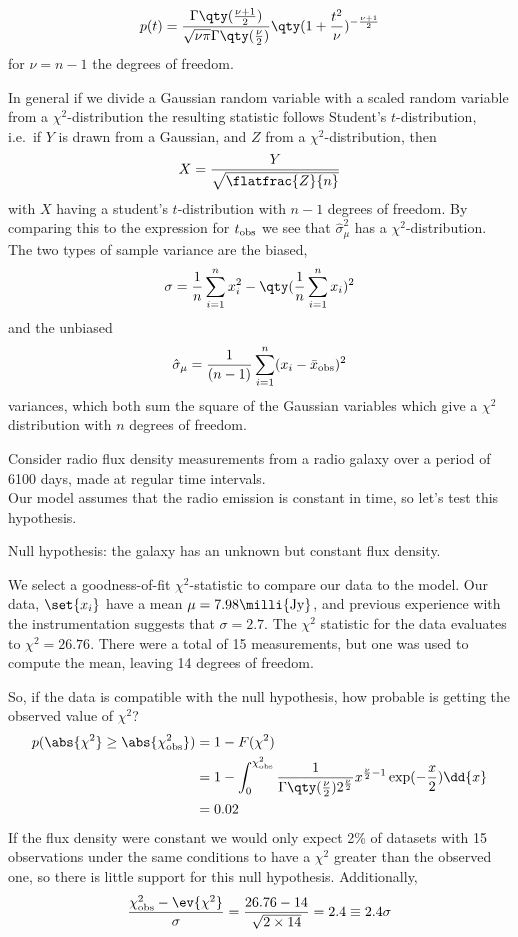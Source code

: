 \documentclass{dwnotes}         		        %
\begin{document}
\begin{definition}
  \begin{equation} p(t) = \frac{\Gamma \qty( \frac{\nu+1}{2} )}{\sqrt{\nu \pi}
    \Gamma \qty( \frac{\nu}{2} ) } \qty( 1 + \frac{t^2}{\nu} )^{-
    \frac{\nu+1}{2}}
\end{equation}
for $\nu = n-1$ the degrees of freedom.
\end{definition}

In general if we divide a Gaussian random variable with a scaled
random variable from a $\chi^2$-distribution the resulting statistic
follows Student's $t$-distribution, i.e.\ if $Y$ is drawn from a
Gaussian, and $Z$ from a $\chi^2$-distribution, then
\[ X = \frac{Y}{\sqrt{\flatfrac{Z}{n}}} \] with $X$ having a student's
$t$-distribution with $n-1$ degrees of freedom.  By comparing this to
the expression for $t_{\rm obs}$ we see that $\hat{\sigma}_{\mu}^2$
has a $\chi^2$-distribution.
The two types of sample variance are the biased,
\[ \sigma = \frac{1}{n} \sum_{i=1}^n x_i^2 - \qty( \frac{1}{n}
\sum_{i=1}^n x_i )^2 \]
and the unbiased
\[ \hat{\sigma}_{\mu} = \frac{1}{(n-1)} \sum_{i=1}^n (x_i -
\bar{x}_{\rm obs})^2 \] variances, which both sum the square of the
Gaussian variables which give a $\chi^2$ distribution with $n$ degrees
of freedom.

\begin{example}
  Consider radio flux density measurements from a radio galaxy over a
  period of 6100 days, made at regular time intervals.\\
  Our model assumes that the radio emission is constant in time, so
  let's test this hypothesis.

  Null hypothesis: the galaxy has an unknown but constant flux density.

  We select a goodness-of-fit $\chi^2$-statistic to compare our data
  to the model. Our data, $\set{x_i}$ have a mean $\mu = 7.98
  \milli{\rm Jy}$, and previous experience with the instrumentation
  suggests that $\sigma = 2.7$. The $\chi^2$ statistic for the data
  evaluates to $\chi^2 = 26.76$. There were a total of 15
  measurements, but one was used to compute the mean, leaving 14
  degrees of freedom.

  So, if the data is compatible with the null hypothesis, how probable
  is getting the observed value of $\chi^2$?
  \begin{align*}
    p(\abs{\chi^2} \ge \abs{\chi^2_{\rm obs}} ) &= 1 - F(\chi^2) \\
    &= 1 - \int_0^{\chi^2_{\rm obs}} \frac{1}{\Gamma \qty( \frac{\nu}{2} ) 2^{\frac{\nu}{2}}} x^{\frac{\nu}{2} - 1} \exp( - \frac{x}{2} ) \dd{x} \\
    &= 0.02
  \end{align*}
  If the flux density were constant we would only expect 2\% of
  datasets with 15 observations under the same conditions to have a
  $\chi^2$ greater than the observed one, so there is little support
  for this null hypothesis. Additionally,
  \[ \frac{\chi^2_{\rm obs} - \ev{\chi^2}}{\sigma} = \frac{26.76 -
    14}{\sqrt{2 \times 14}} = 2.4 \equiv 2.4 \sigma \]

\end{example}
\end{document}
